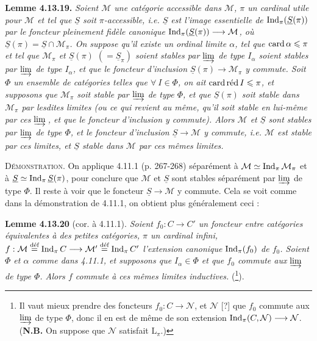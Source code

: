 \textbf{Lemme 4.13.19.} \textit{Soient $\mathcal{M}$ une catégorie accessible dans $\mathcal{M}$, $\pi$ un cardinal utile pour $\mathcal{M}$ et tel que $\underline{S}$ soit $\pi$-accessible, i.e. $\underline{S}$ est l'image essentielle de $\Ind_\pi(\underline{S}(\pi))$ par le foncteur pleinement fidèle canonique $\Ind_\pi(\underline{S}(\pi))\longrightarrow\mathcal{M}$, où $\underline{S}(\pi)=\underline{S}\cap\mathcal{M}_\pi$. On suppose qu'il existe un ordinal limite $\alpha$, tel que $\card\alpha\leqslant\pi$ et tel que $\mathcal{M}_\pi$ et $\underline{S}(\pi)$ $(=\underline{S}_\pi)$ soient stables par $\varinjlim$ de type $I_\alpha$ soient stables par $\varinjlim$ de type $I_\alpha$, et que le foncteur d'inclusion $\underline{S}(\pi)\longrightarrow\mathcal{M}_\pi$ y commute. Soit $\Phi$ un ensemble de catégories telles que $\forall\ I\in\Phi$, on ait $\cardred I\leqslant\pi$, et supposons que $\mathcal{M}_\pi$ soit stable par $\varinjlim$ de type $\Phi$, et que $\underline{S}(\pi)$ soit stable dans $\mathcal{M}_\pi$ par lesdites limites (ou ce qui revient au même, qu'il soit stable en lui-même par ces $\varinjlim$\,, et que le foncteur d'inclusion y commute). Alors $\mathcal{M}$ et $\underline{S}$ sont stables par $\varinjlim$ de type $\Phi$, et le foncteur d'inclusion $\underline{S}\longrightarrow\mathcal{M}$ y commute, i.e. $\mathcal{M}$ est stable par ces limites, et $\underline{S}$ stable dans $\mathcal{M}$ par ces mêmes limites.} %

\textsc{Démonstration}. On applique 4.11.1 (p. 267-268) séparément à $\mathcal{M}\simeq\Ind_\pi\mathcal{M}_\pi$ et à $\underline{S}\simeq\Ind_\pi\underline{S}(\pi)$, pour conclure que $\mathcal{M}$ et $\underline{S}$ sont stables séparément par $\varinjlim$ de type $\Phi$. Il reste à voir que le foncteur $\underline{S}\longrightarrow\mathcal{M}$ y commute. Cela se voit comme dans la démonstration de 4.11.1, on obtient plus généralement ceci :

\textbf{Lemme 4.13.20} (cor. à 4.11.1). \textit{Soient $f_0 : C\longrightarrow C'$ un foncteur entre catégories équivalentes à des petites catégories, $\pi$ un cardinal infini, $f:\mathcal{M}\stackrel{\textup{déf}}{=}\Ind_\pi C\longrightarrow\mathcal{M}'\stackrel{\textup{déf}}{=}\Ind_\pi C'$ l'extension canonique $\Ind_\pi(f_0)$ de $f_0$. Soient $\Phi$ et $\alpha$ comme dans 4.11.1, et supposons que $I_\alpha\in\Phi$ et que $f_0$ commute aux $\varinjlim$ de type $\Phi$. Alors $f$ commute à ces mêmes limites inductives.} (\footnote{Il vaut mieux prendre des foncteurs $f_0 : C\longrightarrow\mathcal{N}$, et $\mathcal{N}$ [?] que $f_0$ commute aux $\varinjlim$ de type $\Phi$, donc il en est de même de son extension $\Ind_\pi(C,\mathcal{N})\longrightarrow\mathcal{N}$. (\textbf{N.B.} On suppose que $\mathcal{N}$ satisfait $\mathrm{L}_\pi$.)}).

